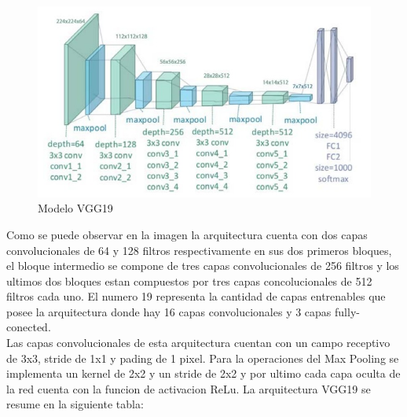 				
				\begin{figure}[ht]
					\centering
					\includegraphics[scale=0.5]{Figs/22.jpeg}
					\caption{Modelo VGG19}
					\label{fig:VGG19}
				\end{figure}			
				
				
				Como se puede observar en la imagen la arquitectura cuenta con dos capas convolucionales de 64 y 128 filtros respectivamente en sus dos primeros bloques, el bloque intermedio se compone de tres capas convolucionales de 256 filtros y los ultimos dos bloques estan compuestos por tres capas concolucionales de 512 filtros cada uno. El numero 19 representa la cantidad de capas entrenables que posee la arquitectura donde hay 16 capas convolucionales y 3 capas fully-conected.\\
				
				Las capas convolucionales de esta arquitectura cuentan con un campo receptivo de 3x3, stride de 1x1 y pading de 1 pixel. Para la operaciones del Max Pooling se implementa un kernel de 2x2 y un stride de 2x2 y por ultimo cada capa oculta de la red cuenta con la funcion de activacion ReLu. La arquitectura VGG19 se resume en la siguiente tabla:
				
